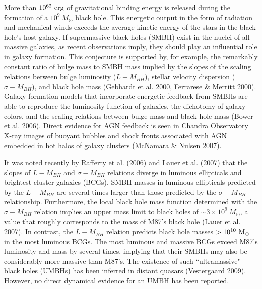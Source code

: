 \documentclass[12pt]{article}
\begin{document}
%
%
\def\gae{\mathrel{\hbox{\rlap{\hbox{\lower2pt\hbox{$\sim$}}}\hbox{\raise2pt\hbox
{$>$}}}}}

\justification          %

More than $10^{62}~\rm erg$ of gravitational binding energy is released during the formation of a $10^9~M_\odot$ black hole.  This energetic output in the form of radiation and mechanical winds exceeds the average kinetic energy of the stars in
the black hole's  host galaxy.  If supermassive black holes (SMBH) exist in the nuclei of all massive galaxies, as recent observations imply, they should play an influential role in galaxy formation.  This conjecture is supported by, for example,  the remarkably constant ratio of bulge mass to SMBH mass implied by the slopes of the  scaling relations between bulge luminosity ($L-M_{BH}$), stellar velocity dispersion ($\sigma - M_{BH}$), and black hole mass (Gebhardt et al. 2000, Ferrarese \& Merritt 2000).   Galaxy formation models that incorporate energetic feedback  from SMBHs 
are able to reproduce the luminosity function of galaxies,  the dichotomy of galaxy colors,  and
the scaling relations between bulge mass and black hole mass (Bower et al. 2006).  Direct evidence for AGN feedback is seen in Chandra Observatory X-ray images of buoyant bubbles and shock fronts associated with AGN embedded in hot halos of galaxy clusters (McNamara \& Nulsen 2007). 


It was noted recently by Rafferty et al. (2006) and Lauer et al. (2007) that the slopes of  $L-M_{BH}$ and  $\sigma - M_{BH}$ relations diverge in luminous ellipticals and brightest cluster galaxies (BCGs).  SMBH masses in luminous ellipticals predicted by the $L- M_{BH}$  are several times larger than those predicted by the $\sigma-M_{BH}$ relationship. Furthermore, the local black hole mass function determined with the $\sigma - M_{BH}$ relation implies an upper mass limit to black holes of $\sim 3\times 10^9~ M_\odot$, a value that roughly corresponds to the mass of M87's black hole (Lauer et al. 2007).
In contrast, the $L-M_{BH}$ relation predicts black hole masses  $> 10^{10}~\rm M_\odot$ in the most luminous BCGs.
The most luminous and massive BCGs exceed M87's luminosity and mass by several 
times, implying that their SMBHs may also be considerably more massive than M87's.    The existence of such ``ultramassive" black holes (UMBHs) has been inferred in distant quasars (Vestergaard 2009).   However,  no direct 
dynamical evidence for an UMBH has been reported.  
\end{document}
